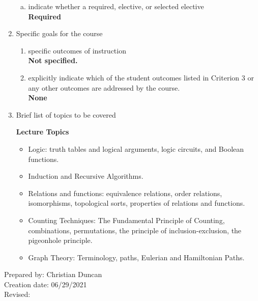 \begin{enumerate}[1.]
\begin{enumerate}[a.]
\item indicate whether a required, elective, or selected elective\\ %
  {\bfseries
    Required
  }

\end{enumerate}

\item Specific goals for the course
\begin{enumerate}
\item specific outcomes of instruction\\ %
  {\bfseries
    Not specified.
  }

\item explicitly indicate which of the student outcomes listed in Criterion 3 or any other outcomes are addressed by the course.\\
  {\bfseries
    None
  }
\end{enumerate}

\item Brief list of topics to be covered\\
  {\bfseries
    Lecture Topics
    \begin{itemize}
    \item Logic: truth tables and logical arguments, logic circuits, and Boolean functions.
    \item Induction and Recursive Algorithms.
    \item Relations and functions: equivalence relations, order relations, isomorphisms, topological sorts, properties of relations and functions.
    \item Counting Techniques:  The Fundamental Principle of Counting, combinations, permutations, the principle of inclusion-exclusion, the pigeonhole principle.
    \item Graph Theory: Terminology, paths, Eulerian and Hamiltonian Paths.
    \end{itemize}
  }

\end{enumerate}

\noindent Prepared by: Christian Duncan\\
\noindent Creation date: 06/29/2021\\
\noindent Revised:\\
